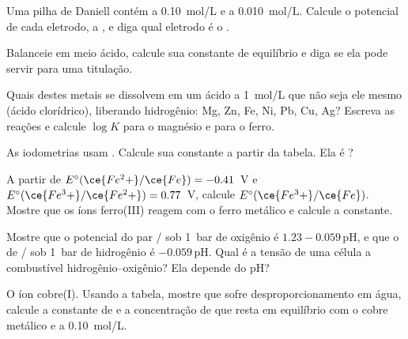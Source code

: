 \begin{exercise}[$\star$]\label{exo:b1:nernst:4}
Uma pilha de Daniell contém  a \qty{0.10}{mol/L} e  a
\qty{0.010}{mol/L}. Calcule o potencial de cada eletrodo, a , e diga qual eletrodo é o .
\end{exercise}

\begin{exercise}[$\star\star$]\label{exo:b1:nernst:5}
Balanceie  em meio ácido, calcule sua constante de
equilíbrio e diga se ela pode servir para uma titulação.
\end{exercise}

\begin{exercise}[$\star\star$]\label{exo:b1:nernst:6}
Quais destes metais se dissolvem em um ácido a \qty{1}{mol/L} que não
seja ele mesmo  (ácido clorídrico), liberando hidrogênio: Mg,
Zn, Fe, Ni, Pb, Cu, Ag? Escreva as reações e calcule $\log K$ para o
magnésio e para o ferro.
\end{exercise}

\begin{exercise}[$\star\star$]\label{exo:b1:nernst:7}
As iodometrias usam . Calcule sua
constante a partir da tabela. Ela é ?
\end{exercise}

\begin{exercise}[$\star\star$]\label{exo:b1:nernst:8}
A partir de $E^\circ(\ce{Fe^2+}/\ce{Fe}) = -0.41$~V e $E^\circ(\ce{Fe^3+}/\ce{Fe^2+})
= 0.77$~V, calcule $E^\circ(\ce{Fe^3+}/\ce{Fe})$. Mostre que os íons
ferro(III) reagem com o ferro metálico e calcule a constante.
\end{exercise}

\begin{exercise}[$\star\star$]\label{exo:b1:nernst:9}
Mostre que o potencial do par / sob \qty{1}{bar} de
oxigênio é $1.23 - 0.059\,\mathrm{pH}$, e que o de / sob
\qty{1}{bar} de hidrogênio é $-0.059\,\mathrm{pH}$. Qual é a tensão de
uma célula a combustível hidrogênio--oxigênio? Ela depende do pH?
\end{exercise}

\begin{exercise}[$\star\star\star$]\label{exo:b1:nernst:10}
O íon cobre(I). Usando a tabela, mostre que  sofre
desproporcionamento em água, calcule a constante de
 e a concentração de  que resta em
equilíbrio com o cobre metálico e  a \qty{0.10}{mol/L}.
\end{exercise}

